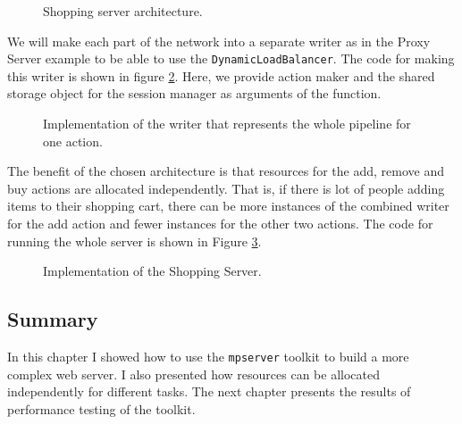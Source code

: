 \begin{figure}[h]
\caption[scale=1.0]{Shopping server architecture.}
\label{fig:shoppingDesign}
\end{figure}

We will make each part of the network into a separate writer as in
the Proxy Server example to be able to use the \texttt{DynamicLoadBalancer}.
The code for making this writer is shown in figure \ref{fig:shoppingWriter}.
Here, we provide action maker and the shared storage object for the session manager 
as arguments of the function.

\begin{figure}[h]
 
\caption[scale=1.0]{Implementation of the writer that represents the whole
pipeline for one action.}
\label{fig:shoppingWriter}
\end{figure}

The benefit of the chosen architecture is that resources for the add, remove
and buy actions are allocated independently. That is, if there is lot of 
people adding items to their shopping cart, there can be more instances
of the combined writer for the add action and fewer instances for the
other two actions. The code for running the whole server is shown
in Figure \ref{fig:ShoppingCode}.

\begin{figure}
 
\caption[scale=1.0]{Implementation of the Shopping Server.}
\label{fig:ShoppingCode}
\end{figure}

\subsection{Summary}
In this chapter I showed how to use the \texttt{mpserver} toolkit
to build a more complex web server. I also presented how resources can
be allocated independently for different tasks. The next chapter 
presents the results of performance testing of the toolkit.


